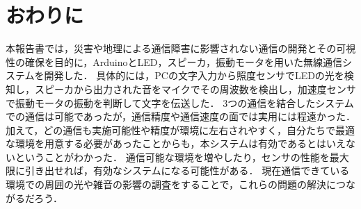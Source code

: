 \section{おわりに}
本報告書では，災害や地理による通信障害に影響されない通信の開発とその可視性の確保を目的に，ArduinoとLED，スピーカ，振動モータを用いた無線通信システムを開発した．
具体的には，PCの文字入力から照度センサでLEDの光を検知し，スピーカから出力された音をマイクでその周波数を検出し，加速度センサで振動モータの振動を判断して文字を伝送した．
3つの通信を結合したシステムでの通信は可能であったが，通信精度や通信速度の面では実用には程遠かった．
加えて，どの通信も実施可能性や精度が環境に左右されやすく，自分たちで最適な環境を用意する必要があったことからも，本システムは有効であるとはいえないということがわかった．
通信可能な環境を増やしたり，センサの性能を最大限に引き出せれば，有効なシステムになる可能性がある．
現在通信できている環境での周囲の光や雑音の影響の調査をすることで，これらの問題の解決につながるだろう．